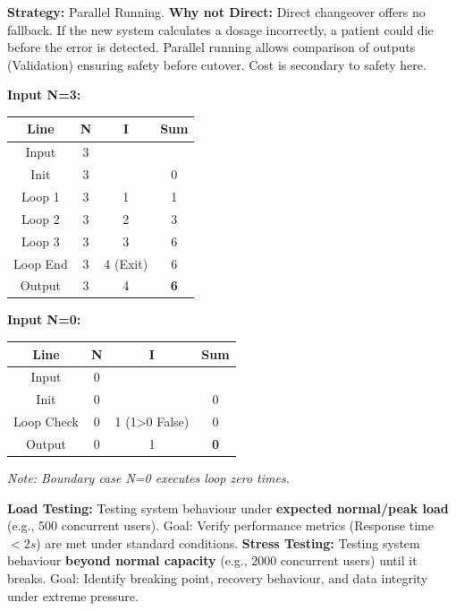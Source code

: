 \documentclass[11pt]{article}
\begin{document}
\begin{corrige}[Exercise 3]
\textbf{Strategy:} Parallel Running. \textbf{Why not Direct:} Direct changeover offers no fallback. If the new system calculates a dosage incorrectly, a patient could die before the error is detected. Parallel running allows comparison of outputs (Validation) ensuring safety before cutover. Cost is secondary to safety here.
\end{corrige}

\begin{corrige}[Exercise 4]
\textbf{Input N=3:}
\begin{center}
\begin{tabular}{|c|c|c|c|}\hline
Line & N & I & Sum \\ \hline
Input & 3 & & \\ \hline
Init & 3 & & 0 \\ \hline
Loop 1 & 3 & 1 & 1 \\ \hline
Loop 2 & 3 & 2 & 3 \\ \hline
Loop 3 & 3 & 3 & 6 \\ \hline
Loop End & 3 & 4 (Exit) & 6 \\ \hline
Output & 3 & 4 & \textbf{6} \\ \hline
\end{tabular}
\end{center}
\textbf{Input N=0:}
\begin{center}
\begin{tabular}{|c|c|c|c|}\hline
Line & N & I & Sum \\ \hline
Input & 0 & & \\ \hline
Init & 0 & & 0 \\ \hline
Loop Check & 0 & 1 (1>0 False) & 0 \\ \hline
Output & 0 & 1 & \textbf{0} \\ \hline
\end{tabular}
\end{center}
\textit{Note: Boundary case N=0 executes loop zero times.}
\end{corrige}

\begin{corrige}[Exercise 5]
\textbf{Load Testing:} Testing system behaviour under \textbf{expected normal/peak load} (e.g., 500 concurrent users). Goal: Verify performance metrics (Response time $< 2s$) are met under standard conditions.
\textbf{Stress Testing:} Testing system behaviour \textbf{beyond normal capacity} (e.g., 2000 concurrent users) until it breaks. Goal: Identify breaking point, recovery behaviour, and data integrity under extreme pressure.
\end{corrige}
\end{document}
